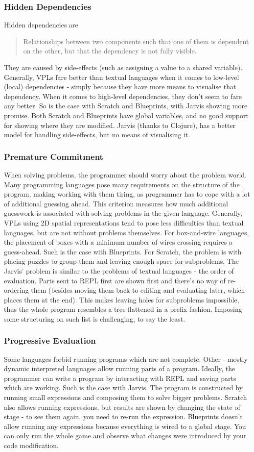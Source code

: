 \documentclass[11pt]{scrartcl}
\begin{document}
\subsubsection{Hidden Dependencies}
Hidden dependencies are
\blockquote[{\cite{Green96UsabilityAnalysis}}]{Relationships between two components such that one of them is dependent on the other, but that the dependency is not fully visible.}
They are caused by side-effects (such as assigning a value to a shared variable). Generally, VPLs fare better than textual languages when it comes to low-level (local) dependencies - simply because they have more means to visualise that dependency. When it comes to high-level dependencies, they don’t seem to fare any better. So is the case with Scratch and Blueprints, with Jarvis showing more promise. Both Scratch and Blueprints have global variables, and no good support for showing where they are modified. Jarvis (thanks to Clojure), has a better model for handling side-effects, but no means of visualising it.
\subsubsection{Premature Commitment}
When solving problems, the programmer should worry about the problem world. Many programming languages pose many requirements on the structure of the program, making working with them tiring, as programmer has to cope with a lot of additional guessing ahead. This criterion measures how much additional guesswork is associated with solving problems in the given language. Generally, VPLs using 2D spatial representations tend to pose less difficulties than textual languages, but are not without problems themselves. For box-and-wire languages, the placement of boxes with a minimum number of wires crossing requires a guess-ahead. Such is the case with Blueprints. For Scratch, the problem is with placing puzzles to group them and leaving enough space for subproblems. The Jarvis’ problem is similar to the problems of textual languages - the order of evaluation. Parts sent to REPL first are shown first and there’s no way of re-ordering them (besides moving them back to editing and evaluating later, which places them at the end). This makes leaving holes for subproblems impossible, thus the whole program resembles a tree flattened in a prefix fashion. Imposing some structuring on such list is challenging, to say the least.
\subsubsection{Progressive Evaluation}
Some languages forbid running programs which are not complete. Other - mostly dynamic interpreted languages allow running parts of a program. Ideally, the programmer can write a program by interacting with REPL and saving parts which are working. Such is the case with Jarvis. The program is constructed by running small expressions and composing them to solve bigger problems. Scratch also allows running expressions, but results are shown by changing the state of stage - to see them again, you need to re-run the expression. Blueprints doesn’t allow running any expressions because everything is wired to a global stage. You can only run the whole game and observe what changes were introduced by your code modification.
\end{document}
